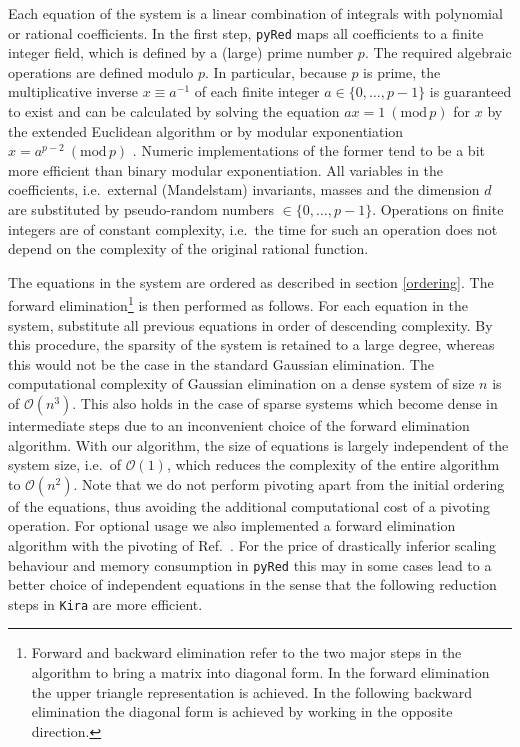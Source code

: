 \documentclass[a4paper,12pt]{scrartcl}
\newcommand*{\kira}{\texttt{Kira}}
\newcommand*{\pyred}{\texttt{pyRed}}
\begin{document}
Each equation of the system is a linear combination of integrals with polynomial
or rational coefficients. In the first step, \pyred{} maps all coefficients to
a finite integer field, which is defined by a (large) prime number $p$. The
required algebraic operations are defined modulo $p$. In particular, because $p$
is prime, the multiplicative inverse $x\equiv a^{-1}$ of each finite integer
$a\in\{0,\dots,p-1\}$ is guaranteed to exist and can be calculated by solving
the equation $ax=1~(\mathrm{mod}\,p)$ for $x$ by the extended Euclidean
algorithm or by modular exponentiation $x=a^{p-2}~(\mathrm{mod}\,p)$ \cite{Gathen:2013}. Numeric
implementations of the former tend to be a bit more efficient than binary
modular exponentiation. All variables in the coefficients, i.e.\ external
(Mandelstam) invariants, masses and the dimension $d$ are substituted by
pseudo-random numbers $\in\{0,\dots,p-1\}$. Operations on finite integers are of
constant complexity, i.e.\ the time for such an operation does not depend on the
complexity of the original rational function.

The equations in the system are ordered as described in section \ref{ordering}.
The forward elimination\footnote{Forward and backward elimination
  refer to the two major steps in the algorithm to
  bring a matrix into diagonal form. In the forward elimination the
  upper triangle representation is achieved. In the following backward
  elimination the diagonal form is achieved by working in the opposite
  direction.} is then performed as follows. For each equation in the
system, substitute all previous equations in order of descending complexity. By
this procedure, the sparsity of the system is retained to a large degree,
whereas this would not be the case in the standard Gaussian elimination. The
computational complexity of Gaussian elimination on a dense system of size $n$
is of $\mathcal{O}(n^3)$. This also holds in the case of sparse systems which
become dense in intermediate steps due to an inconvenient choice of the forward
elimination algorithm. With our algorithm, the size of equations is largely
independent of the system size, i.e.\ of $\mathcal{O}(1)$, which reduces the
complexity of the entire algorithm to $\mathcal{O}(n^2)$. 
Note that we do not
perform pivoting apart from the initial ordering of the equations, thus avoiding
the additional computational cost of a pivoting operation. For optional usage we
also implemented a forward elimination algorithm with the pivoting of
Ref.~\cite{Kant:2013vta}. For the price of drastically inferior scaling behaviour and
memory consumption in \pyred{} this may in some cases lead to a better choice of
independent equations in the sense that the following reduction steps in \kira{}
are more efficient.
\end{document}
